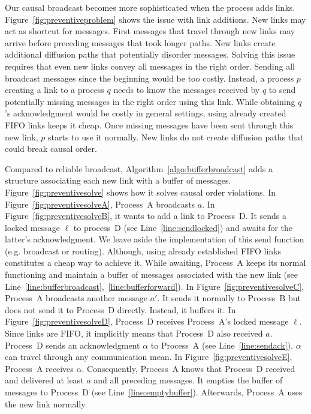 Our causal broadcast becomes more sophisticated when the process adds links.
Figure~\ref{fig:preventiveproblem} shows the issue with link additions.  New
links may act as shortcut for messages. First messages that travel through new
links may arrive before preceding messages that took longer paths. New links
create additional diffusion paths that potentially disorder messages.  Solving
this issue requires that even new links convey all messages in the right
order. Sending all broadcast messages since the beginning would be too
costly. Instead, a process $p$ creating a link to a process $q$ needs to know
the messages received by $q$ to send potentially missing messages in the right
order using this link. While obtaining $q$'s acknowledgment would be costly in
general settings, using already created FIFO links keeps it cheap. Once missing
messages have been sent through this new link, $p$ starts to use it
normally. New links do not create diffusion paths that could break causal order.

Compared to reliable broadcast, Algorithm~\ref{algo:bufferbroadcast} adds a
structure associating each new link with a buffer of
messages. Figure~\ref{fig:preventivesolve} shows how it solves causal order
violations. In Figure~\ref{fig:preventivesolveA}, Process~A broadcasts $a$.  In
Figure~\ref{fig:preventivesolveB}, it wants to add a link to Process~D. It sends
a locked message $\ell$ to process~D (see Line~\ref{line:sendlocked}) and awaits
for the latter's acknowledgment.  We leave aside the implementation of this send
function (e.g. broadcast or routing). Although, using already established FIFO
links constitutes a cheap way to achieve it. While awaiting, Process~A keeps its
normal functioning and maintain a buffer of messages associated with the new
link (see Line~\ref{line:bufferbroadcast},~\ref{line:bufferforward}). In
Figure~\ref{fig:preventivesolveC}, Process~A broadcasts another message $a'$. It
sends it normally to Process~B but does not send it to Process~D
directly. Instead, it buffers it. In Figure~\ref{fig:preventivesolveD},
Process~D receives Process~A's locked message $\ell$. Since links are FIFO, it
implicitly means that Process~D also received $a$. Process~D sends an
acknowledgment $\alpha$ to Process~A (see Line~\ref{line:sendack}). $\alpha$ can
travel through any communication mean. In Figure~\ref{fig:preventivesolveE},
Process~A receives $\alpha$. Consequently, Process~A knows that Process~D
received and delivered at least $a$ and all preceding messages. It empties the
buffer of messages to Process~D (see Line~\ref{line:emptybuffer}). Afterwards,
Process~A uses the new link normally.


